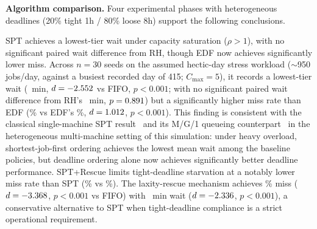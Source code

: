 {\textbf{Algorithm comparison.} Four experimental phases with heterogeneous deadlines (20\% tight 1h / 80\% loose 8h) support the following conclusions.

SPT achieves a lowest-tier wait under capacity saturation ($\rho>1$), with no significant paired wait difference from RH, though EDF now achieves significantly lower miss. Across $n=30$ seeds on the assumed hectic-day stress workload ($\sim$950 jobs/day, against a busiest recorded day of 415; $C_{\max}=5$), it records a lowest-tier wait (\SPTwait~min, $d=-2.552$ vs FIFO, $p<0.001$; with no significant paired wait difference from RH's \RHWait~min, $p=0.891$) but a significantly higher miss rate than EDF (\SPTmiss\% vs EDF's \EDFmiss\%, $d=1.012$, $p<0.001$). This finding is consistent with the classical single-machine SPT result~\cite{smith1956various} and its M/G/1 queueing counterpart~\cite{pinedo2016scheduling} in the heterogeneous multi-machine setting of this simulation: under heavy overload, shortest-job-first ordering achieves the lowest mean wait among the baseline policies, but deadline ordering alone now achieves significantly better deadline performance.
SPT+Rescue limits tight-deadline starvation at a notably lower miss rate than SPT (\RescueMiss\% vs \SPTmiss\%). The laxity-rescue mechanism achieves \RescueMiss\% miss ($d=-3.368$, $p<0.001$ vs FIFO) with \RescueWait~min wait ($d=-2.336$, $p<0.001$), a conservative alternative to SPT when tight-deadline compliance is a strict operational requirement.

}
